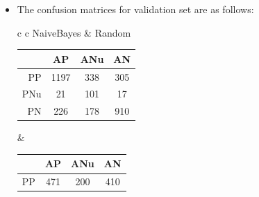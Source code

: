 \documentclass[12pt]{article}
\begin{document}
\begin{enumerate}[label=(\alph*)]
\begin{itemize}
                    \begin{center}
                        \begin{tabular}{c}
                            All Positive \\
                            \begin{tabular}{r|c|c|c}
                                    & AP    & ANu  & AN    \\
                                \hline
                                PP  & 16602 & 7096 & 14166 \\
                                \hline
                                PNu & 0     & 0    & 0     \\
                                \hline
                                PN  & 0     & 0    & 0     \\
                                \hline
                            \end{tabular}
                        \end{tabular}
                    \end{center}
              \item The confusion matrices for validation set are as follows:
                    \begin{center}
                        \begin{tabular}{c c}
                            NaiveBayes                & Random \\
                            \begin{tabular}{r|c|c|c}
                                    & AP   & ANu & AN  \\
                                \hline
                                PP  & 1197 & 338 & 305 \\
                                \hline
                                PNu & 21   & 101 & 17  \\
                                \hline
                                PN  & 226  & 178 & 910 \\
                                \hline
                            \end{tabular} &
                            \begin{tabular}{r|c|c|c}
                                    & AP  & ANu & AN  \\
                                \hline
                                PP  & 471 & 200 & 410 \\
                                \hline

\end{tabular}
\end{tabular}
\end{center}
\end{itemize}
\end{enumerate}
\end{document}
